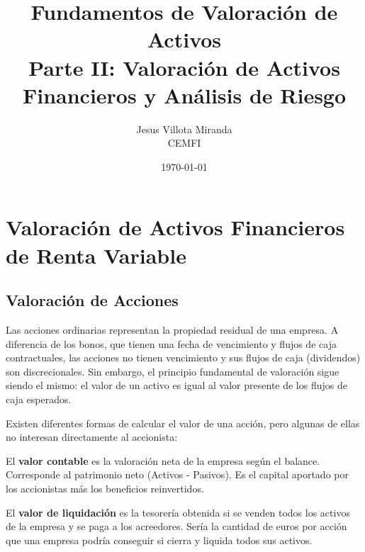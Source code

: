 

\title{\textbf{Fundamentos de Valoración de Activos}\\
\large Parte II: Valoración de Activos Financieros y Análisis de Riesgo}
\author{Jesus Villota Miranda\\
CEMFI}
\date{\today}



\maketitle

\tableofcontents
\newpage

\section{Valoración de Activos Financieros de Renta Variable}

\subsection{Valoración de Acciones}

Las acciones ordinarias representan la propiedad residual de una empresa. A diferencia de los bonos, que tienen una fecha de vencimiento y flujos de caja contractuales, las acciones no tienen vencimiento y sus flujos de caja (dividendos) son discrecionales. Sin embargo, el principio fundamental de valoración sigue siendo el mismo: el valor de un activo es igual al valor presente de los flujos de caja esperados.

Existen diferentes formas de calcular el valor de una acción, pero algunas de ellas no interesan directamente al accionista:

\begin{definicion}
El \textbf{valor contable} es la valoración neta de la empresa según el balance. Corresponde al patrimonio neto (Activos - Pasivos). Es el capital aportado por los accionistas más los beneficios reinvertidos.
\end{definicion}

\begin{definicion}
El \textbf{valor de liquidación} es la tesorería obtenida si se venden todos los activos de la empresa y se paga a los acreedores. Sería la cantidad de euros por acción que una empresa podría conseguir si cierra y liquida todos sus activos.
\end{definicion}

